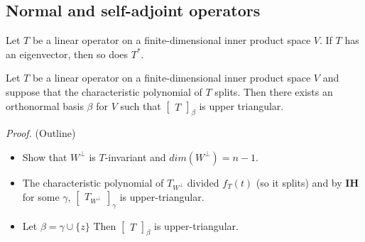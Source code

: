 \documentclass[12pt]{article}
\newenvironment{lemma}[2][Lemma]{\begin{trivlist}
\item[\hskip \labelsep {\bfseries #1}\hskip \labelsep {\bfseries #2.}]}{\end{trivlist}}
\newenvironment{theorem}[2][Theorem]{\begin{trivlist}
\item[\hskip \labelsep {\bfseries #1}\hskip \labelsep {\bfseries #2.}]}{\end{trivlist}}
\begin{document}
\subsection{Normal and self-adjoint operators}

\begin{lemma}{15}
Let $T$ be a linear operator on a finite-dimensional inner product space $V$. If $T$ has an eigenvector, then so does $T^*$.
\end{lemma}

\begin{theorem}{6.14 (Schur)}
Let $T$ be a linear operator on a finite-dimensional inner product space $V$ and suppose that the characteristic polynomial of $T$ splits. Then there exists an orthonormal basis $\beta$ for $V$ such that $\begin{bmatrix}
T
\end{bmatrix}_\beta$ is upper triangular.
\end{theorem}

\textit{Proof.} (Outline)

\begin{itemize}
    \item Show that $W^\perp$ is $T$-invariant and $dim(W^\perp) = n - 1$.
    
    \item The characteristic polynomial of $T_{W^\perp}$ divided $f_T(t)$ (so it splits) and by \textbf{IH} for some $\gamma$, $\begin{bmatrix}
    T_{W^\perp}
    \end{bmatrix}_\gamma$ is upper-triangular.
    
    \item Let $\beta = \gamma \cup \{z\}$ Then $\begin{bmatrix}
    T
    \end{bmatrix}_\beta$ is upper-triangular.
\end{itemize}
\end{document}
